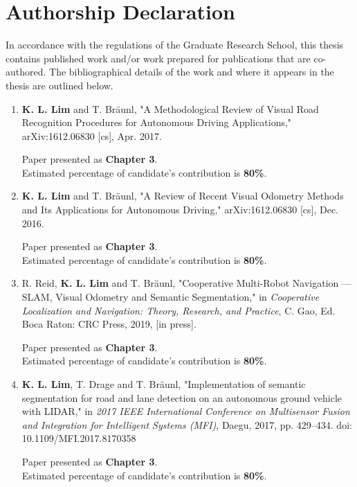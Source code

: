 \cleardoublepage
\setsinglecolumn
\chapter*{\centering \Large Authorship Declaration}
\thispagestyle{empty}


In accordance with the regulations of the Graduate Research School, this thesis contains published work and/or work prepared for publications that are co-authored. The bibliographical details of the work and where it appears in the thesis are outlined below.

\begin{enumerate}
	\item \textbf{K. L. Lim} and T. Bräunl, "A Methodological Review of Visual Road Recognition Procedures for Autonomous Driving Applications," arXiv:1612.06830 [cs], Apr. 2017.
	
	Paper presented as \textbf{Chapter 3}. \\
	Estimated percentage of candidate's contribution is \textbf{80\%}.
	
	\item \textbf{K. L. Lim} and T. Bräunl, "A Review of Recent Visual Odometry Methods and Its Applications for Autonomous Driving," arXiv:1612.06830 [cs], Dec. 2016.
	
	Paper presented as \textbf{Chapter 3}. \\
	Estimated percentage of candidate's contribution is \textbf{80\%}.
	
	\item R. Reid, \textbf{K. L. Lim} and T. Bräunl, "Cooperative Multi-Robot Navigation --- SLAM, Visual Odometry and Semantic Segmentation," in \textit{Cooperative Localization and Navigation: Theory, Research, and Practice}, C. Gao, Ed. Boca Raton: CRC Press, 2019, [in press].
	
	Paper presented as \textbf{Chapter 3}. \\
	Estimated percentage of candidate's contribution is \textbf{80\%}.
	
	\item \textbf{K. L. Lim}, T. Drage and T. Bräunl, "Implementation of semantic segmentation for road and lane detection on an autonomous ground vehicle with LIDAR," in \textit{2017 IEEE International Conference on Multisensor Fusion and Integration for Intelligent Systems (MFI)}, Daegu, 2017, pp. 429--434. doi: 10.1109/MFI.2017.8170358
	
	Paper presented as \textbf{Chapter 3}. \\
	Estimated percentage of candidate's contribution is \textbf{80\%}.
	

\end{enumerate}
